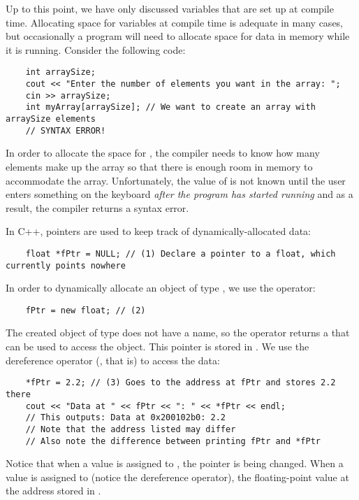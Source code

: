Up to this point, we have only discussed variables that are set up at compile time. 
Allocating space for variables at compile time is adequate in many cases, but occasionally a program will need to allocate space for data in memory while it is running. 
Consider the following code:

\begin{lstlisting}
	int arraySize;
	cout << "Enter the number of elements you want in the array: ";
	cin >> arraySize;
	int myArray[arraySize]; // We want to create an array with arraySize elements
	// SYNTAX ERROR!
\end{lstlisting}

In order to allocate the space for , the compiler needs to know how many elements make up the array so that there is enough room in memory to accommodate the array. 
Unfortunately, the value of  is not known until the user enters something on the keyboard \emph{after the program has started running} and as a result, the compiler returns a syntax error. 

In C++, pointers are used to keep track of dynamically-allocated data:

\begin{lstlisting}
	float *fPtr = NULL; // (1) Declare a pointer to a float, which currently points nowhere
\end{lstlisting}

In order to dynamically allocate an object of type , we use the  operator:

\begin{lstlisting}
	fPtr = new float; // (2)
\end{lstlisting}


The created object of type  does not have a name, so the  operator returns a  that can be used to access the object. 
This pointer is stored in . 
We use the dereference operator (\Code{*}, that is) to access the data:

\begin{lstlisting}
	*fPtr = 2.2; // (3) Goes to the address at fPtr and stores 2.2 there
	cout << "Data at " << fPtr << ": " << *fPtr << endl;
	// This outputs: Data at 0x200102b0: 2.2
	// Note that the address listed may differ
	// Also note the difference between printing fPtr and *fPtr
\end{lstlisting}

Notice that when a value is assigned to , the pointer is being changed. 
When a value is assigned to  (notice the dereference operator), the floating-point value at the address stored in . 

